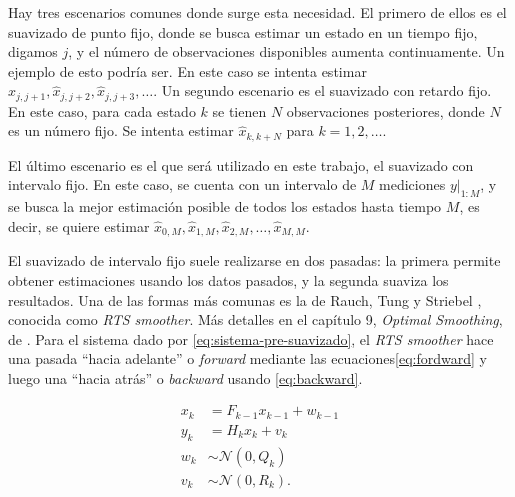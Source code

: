 Hay tres escenarios comunes donde surge esta necesidad. El primero de ellos es el suavizado de punto fijo, donde se busca estimar un estado en un tiempo fijo, digamos \(j\), y el número de observaciones disponibles aumenta continuamente. Un ejemplo de esto podría ser. En este caso se intenta estimar \(\hat{x}_{j, j+1}, \hat{x}_{j, j+2}, \hat{x}_{j, j+3}, \dots\). Un segundo escenario es el suavizado con retardo fijo. En este caso, para cada estado \(k\) se tienen \(N\) observaciones posteriores, donde \(N\) es un número fijo. Se intenta estimar \(\hat{x}_{k, k+N}\) para \(k = 1, 2, \dots\). 

El último escenario es el que será utilizado en este trabajo, el suavizado con intervalo fijo. En este caso, se cuenta con un intervalo de \(M\) mediciones \(\left. y \right|_{1:M}\), y se busca la mejor estimación posible de todos los estados hasta tiempo \(M\), es decir, se quiere estimar \(\hat{x}_{0,M}, \hat{x}_{1,M}, \hat{x}_{2,M}, \dots, \hat{x}_{M,M}\). 


El suavizado de intervalo fijo suele realizarse en dos pasadas: la primera permite obtener estimaciones usando los datos pasados, y la segunda suaviza los resultados. Una de las formas más comunas es la de Rauch, Tung y Striebel \cite{Rauch1965}, conocida como \textit{RTS smoother}. Más detalles en el capítulo 9, \textit{Optimal Smoothing}, de \cite{Simon2006}. Para el sistema dado por \ref{eq:sistema-pre-suavizado}, el \textit{RTS smoother} hace una pasada ``hacia adelante'' o \textit{forward} mediante las ecuaciones\ref{eq:fordward} y luego una ``hacia atrás'' o \textit{backward} usando \ref{eq:backward}.




\begin{equation}\label{eq:sistema-pre-suavizado}
\begin{aligned}
x_k &= F_{k-1}x_{k-1} + w_{k-1} \\ 
y_k &= H_k x_k + v_k \\ 
w_k &\sim  \mathcal{N}(0, Q_k)\\
v_k &\sim  \mathcal{N}(0, R_k).
\end{aligned}
\end{equation}

